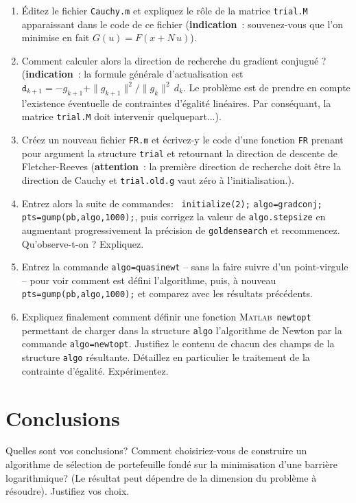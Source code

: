 \documentclass[10pt,a4paper,fleqn]{report}
\newcommand{\matlab}{\textsc{Matlab}}
\newcommand{\onit}{\begin{enumerate}}
\newcommand{\offit}{\end{enumerate}}
\renewcommand{\tt}{\texttt}
\begin{document}
\bigskip

\onit
\item \'Editez le fichier \tt{Cauchy.m} et expliquez le r\^ole de la matrice \texttt{trial.M} apparaissant dans le code de ce fichier (\textbf{indication}~: souvenez-vous que l'on minimise en fait $G(u)=F(x+N\,u)$).
\item Comment calculer alors la direction de recherche du gradient conjugu\'e ? (\textbf{indication}~: la formule g\'en\'erale d'actualisation est $\mathtt d_{k+1}=-g_{k+1}+\|g_{k+1}\|^2/\|g_k\|^2\,d_k$. Le probl\`eme est de prendre en compte l'existence \'eventuelle de contraintes d'\'egalit\'e lin\'eaires. Par cons\'equant, la matrice \tt{trial.M} doit intervenir quelquepart...).
\item Créez un nouveau fichier \texttt{FR.m} et écrivez-y le code d'une fonction \texttt{FR} prenant pour argument la structure \texttt{trial} et retournant la direction de  descente de Fletcher-Reeves (\textbf{attention}~: la premi\`ere direction de recherche doit \^etre la direction de Cauchy et \tt{trial.old.g}  vaut z\'ero \`a  l'initialisation.).
\item Entrez alors la suite de commandes:
\tt{ initialize(2);} \tt{algo=gradconj;} \tt{pts=gump(pb,algo,1000);},
puis corrigez la valeur de \texttt{algo.stepsize} en augmentant progressivement la pr\'ecision de \texttt{goldensearch} et recommencez. Qu'observe-t-on ? Expliquez.
\item Entrez la commande \tt{algo=quasinewt} -- sans la faire suivre d'un point-virgule -- pour voir comment est d\'efini l'algorithme, puis, à nouveau \tt{pts=gump(pb,algo,1000);} et comparez avec les résultats précédents.
\item Expliquez finalement comment définir une fonction \matlab\ \tt{newtopt} permettant de charger dans la structure \tt{algo} l'algorithme de Newton par la commande \tt{algo=newtopt}. Justifiez le contenu de chacun des champs de la structure \tt{algo} résultante. Détaillez en particulier le traitement de la contrainte d'égalité. Expérimentez.

\offit

\section{Conclusions}

\bigskip

Quelles sont vos conclusions? Comment choisiriez-vous de construire un algorithme  de sélection de portefeuille fondé sur la minimisation d'une barrière logarithmique? (Le résultat peut dépendre de la dimension du problème à résoudre). Justifiez vos choix.
\end{document}

